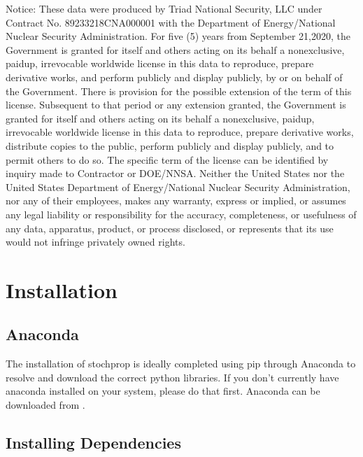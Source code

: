 \documentclass[letterpaper,10pt,english]{sphinxmanual}
\begin{document}
Notice: These data were produced by Triad National Security, LLC under Contract No. 89233218CNA000001 with the Department of Energy/National Nuclear Security Administration. For five (5) years from September 21,2020, the Government is granted for itself and others acting on its behalf a nonexclusive, paid\sphinxhyphen{}up, irrevocable worldwide license in this data to reproduce, prepare derivative works, and perform publicly and display publicly, by or on behalf of the Government. There is provision for the possible extension of the term of this license. Subsequent to that period or any extension granted, the Government is granted for itself and others acting on its behalf a nonexclusive, paid\sphinxhyphen{}up, irrevocable worldwide license in this data to reproduce, prepare derivative works, distribute copies to the public, perform publicly and display publicly, and to permit others to do so. The specific term of the license can be identified by inquiry made to Contractor or DOE/NNSA. Neither the United States nor the United States Department of Energy/National Nuclear Security Administration, nor any of their employees, makes any warranty, express or implied, or assumes any legal liability or responsibility for the accuracy, completeness, or usefulness of any data, apparatus, product, or process disclosed, or represents that its use would not infringe privately owned rights.


\section{Installation}
\label{\detokenize{installation:installation}}\label{\detokenize{installation:id1}}\label{\detokenize{installation::doc}}

\subsection{Anaconda}
\label{\detokenize{installation:anaconda}}
The installation of stochprop is ideally completed using pip through Anaconda to resolve and download the correct python libraries. If you don’t currently have anaconda installed
on your system, please do that first.  Anaconda can be downloaded from .


\subsection{Installing Dependencies}
\label{\detokenize{installation:installing-dependencies}}
\end{document}
